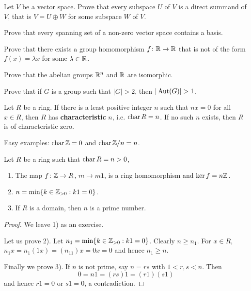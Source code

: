 \begin{exercise}
    Let $V$ be a vector space. Prove that every subspace $U$ of $V$ is a direct summand of $V$, that is
    $V=U\oplus W$ for some subspace $W$ of $V$. 
\end{exercise}

\begin{exercise}
    Prove that every spanning set of a non-zero vector space
    contains a basis. 
\end{exercise}

\begin{exercise}
\label{xca:fx=cx}
    Prove that there exists a group homomorphism $f\colon\mathbb{R}\to\mathbb{R}$ that 
    is not of the form $f(x)=\lambda x$ for some $\lambda\in\mathbb{R}$. 
\end{exercise}


\begin{exercise}
\label{xca:Rn=R}
    Prove that the abelian groups $\mathbb{R}^n$ and $\mathbb{R}$ are isomorphic.
\end{exercise}

\begin{exercise}
\label{xca:aut}
    Prove that if $G$ is a group such that $|G|>2$, then $|\Aut(G)|>1$.
\end{exercise}


\begin{definition}
Let $R$ be a ring. If there is a least positive integer $n$ such that 
$nx=0$ for all $x\in R$, then $R$ has \textbf{characteristic} $n$, i.e. $\operatorname{char} R=n$. If no such $n$ exists, 
then $R$ is of characteristic zero. 
\end{definition}

Easy examples: $\operatorname{char}\mathbb{Z}=0$ and $\operatorname{char}\mathbb{Z}/n=n$.

\begin{proposition}
    Let $R$ be a ring such that $\operatorname{char} R=n>0$,
    \begin{enumerate}
        \item The map $f\colon \mathbb{Z}\to R$, $m\mapsto m1$, is a ring homomorphism and $\ker f=n\mathbb{Z}$.  
        \item $n=\min\{k\in\mathbb{Z}_{>0}:k1=0\}$.
        \item If $R$ is a domain, then $n$ is a prime number.
    \end{enumerate}
\end{proposition}

\begin{proof}
    We leave 1) as an exercise. 
    
    Let us prove 2). Let $n_1=\min\{k\in\mathbb{Z}_{>0}:k1=0\}$. Clearly 
    $n\geq n_1$. For $x\in R$,
    $n_1x=n_1(1x)=(n_11)x=0x=0$ 
    and hence $n_1\geq n$. 
    
    Finally we prove 3). If $n$ is not prime, say
    $n=rs$ with $1<r,s<n$. Then 
    \[
    0=n1=(rs)1=(r1)(s1)
    \]
    and hence $r1=0$ or $s1=0$, a contradiction. 
\end{proof}

